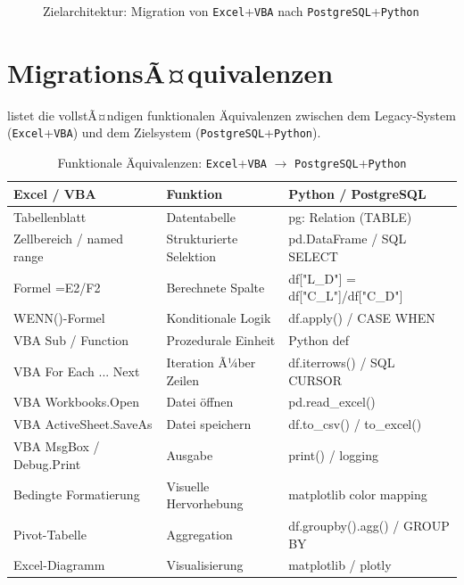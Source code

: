 ﻿\documentclass[12pt,a4paper]{report}
\theoremstyle{definition}
\theoremstyle{remark}
\newcommand{\excel}{\texttt{Excel}}
\newcommand{\vba}{\texttt{VBA}}
\newcommand{\pg}{\texttt{PostgreSQL}}
\newcommand{\py}{\texttt{Python}}
\begin{document}
\begin{figure}[H]
\caption{Zielarchitektur: Migration von \excel{}+\vba{} nach \pg{}+\py{}}
\label{fig:arch}
\end{figure}

\section{MigrationsÃ¤quivalenzen}

 listet die vollstÃ¤ndigen funktionalen \"Aquivalenzen zwischen
dem Legacy-System (\excel{}+\vba) und dem Zielsystem (\pg{}+\py).

\begin{table}[H]
\centering
\caption{Funktionale \"Aquivalenzen: \excel{}+\vba{} $\to$ \pg{}+\py}
\label{tab:equiv}
\renewcommand{\arraystretch}{1.3}
\begin{tabularx}{\linewidth}{>{\ttfamily\footnotesize}l >{\footnotesize}X >{\ttfamily\footnotesize}X}
\toprule
\textbf{Excel / VBA}         & \textbf{Funktion}                  & \textbf{Python / PostgreSQL} \\
\midrule
Tabellenblatt                & Datentabelle                       & pg: Relation (TABLE) \\
Zellbereich / named range    & Strukturierte Selektion            & pd.DataFrame / SQL SELECT \\
Formel =E2/F2                & Berechnete Spalte                  & df["L\_D"] = df["C\_L"]/df["C\_D"] \\
WENN()-Formel                & Konditionale Logik                 & df.apply() / CASE WHEN \\
VBA Sub / Function           & Prozedurale Einheit                & Python def \\
VBA For Each ... Next        & Iteration Ã¼ber Zeilen              & df.iterrows() / SQL CURSOR \\
VBA Workbooks.Open           & Datei \"offnen                       & pd.read\_excel() \\
VBA ActiveSheet.SaveAs       & Datei speichern                    & df.to\_csv() / to\_excel() \\
VBA MsgBox / Debug.Print     & Ausgabe                            & print() / logging \\
Bedingte Formatierung        & Visuelle Hervorhebung              & matplotlib color mapping \\
Pivot-Tabelle                & Aggregation                        & df.groupby().agg() / GROUP BY \\
Excel-Diagramm               & Visualisierung                     & matplotlib / plotly \\
\bottomrule
\end{tabularx}
\end{table}
\end{document}
